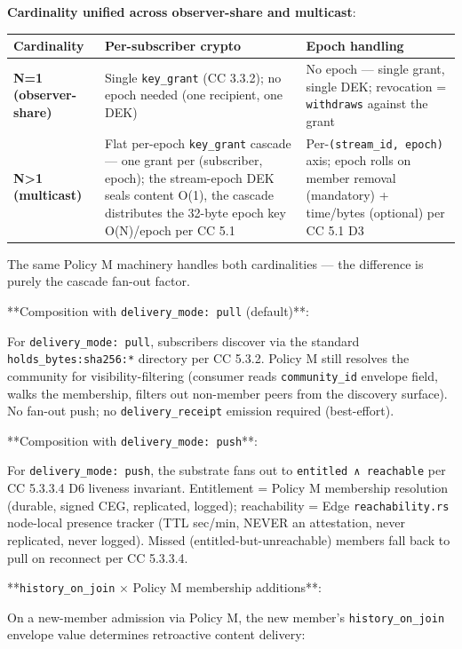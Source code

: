 \documentclass[11pt]{article}
\begin{document}
\textbf{Cardinality unified across observer-share and multicast}:


{\footnotesize
\begin{longtable}{|p{5.33cm}|p{5.33cm}|p{5.33cm}|}\hline
\textbf{Cardinality} & \textbf{Per-subscriber crypto} & \textbf{Epoch handling} \\ \hline\endhead
\textbf{N=1 (observer-share)} & Single \texttt{key\_grant} (CC 3.3.2); no epoch needed (one recipient, one DEK) & No epoch — single grant, single DEK; revocation = \texttt{withdraws} against the grant \\ \hline
\textbf{N>1 (multicast)} & Flat per-epoch \texttt{key\_grant} cascade — one grant per (subscriber, epoch); the stream-epoch DEK seals content O(1), the cascade distributes the 32-byte epoch key O(N)/epoch per CC 5.1 & Per-\texttt{(stream\_id, epoch)} axis; epoch rolls on member removal (mandatory) + time/bytes (optional) per CC 5.1 D3 \\ \hline
\end{longtable}}


The same Policy M machinery handles both cardinalities — the difference is purely the cascade fan-out factor.


**Composition with \texttt{delivery\_mode: pull} (default)**:


For \texttt{delivery\_mode: pull}, subscribers discover via the standard \texttt{holds\_bytes:sha256:*} directory per CC 5.3.2. Policy M still resolves the community for visibility-filtering (consumer reads \texttt{community\_id} envelope field, walks the membership, filters out non-member peers from the discovery surface). No fan-out push; no \texttt{delivery\_receipt} emission required (best-effort).


**Composition with \texttt{delivery\_mode: push}**:


For \texttt{delivery\_mode: push}, the substrate fans out to \texttt{entitled ∧ reachable} per CC 5.3.3.4 D6 liveness invariant. Entitlement = Policy M membership resolution (durable, signed CEG, replicated, logged); reachability = Edge \texttt{reachability.rs} node-local presence tracker (TTL sec/min, NEVER an attestation, never replicated, never logged). Missed (entitled-but-unreachable) members fall back to pull on reconnect per CC 5.3.3.4.


**\texttt{history\_on\_join} × Policy M membership additions**:


On a new-member admission via Policy M, the new member's \texttt{history\_on\_join} envelope value determines retroactive content delivery:
\end{document}
